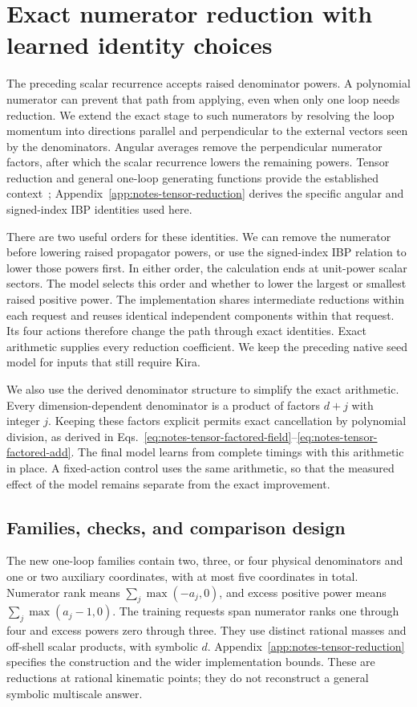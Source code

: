 \section{Exact numerator reduction with learned identity choices}
\label{sec:notes-tensor-results}
The preceding scalar recurrence accepts raised denominator powers. A polynomial numerator can prevent that path from applying, even when only one loop needs reduction. We extend the exact stage to such numerators by resolving the loop momentum into directions parallel and perpendicular to the external vectors seen by the denominators. Angular averages remove the perpendicular numerator factors, after which the scalar recurrence lowers the remaining powers. Tensor reduction and general one-loop generating functions provide the established context~\cite{DennerDittmaier2006,Hu2025}; Appendix~\ref{app:notes-tensor-reduction} derives the specific angular and signed-index IBP identities used here.

There are two useful orders for these identities. We can remove the numerator before lowering raised propagator powers, or use the signed-index IBP relation to lower those powers first. In either order, the calculation ends at unit-power scalar sectors. The model selects this order and whether to lower the largest or smallest raised positive power. The implementation shares intermediate reductions within each request and reuses identical independent components within that request. Its four actions therefore change the path through exact identities. Exact arithmetic supplies every reduction coefficient. We keep the preceding native seed model for inputs that still require Kira.

We also use the derived denominator structure to simplify the exact arithmetic. Every dimension-dependent denominator is a product of factors $d+j$ with integer $j$. Keeping these factors explicit permits exact cancellation by polynomial division, as derived in Eqs.~\eqref{eq:notes-tensor-factored-field}--\eqref{eq:notes-tensor-factored-add}. The final model learns from complete timings with this arithmetic in place. A fixed-action control uses the same arithmetic, so that the measured effect of the model remains separate from the exact improvement.

\subsection{Families, checks, and comparison design}
The new one-loop families contain two, three, or four physical denominators and one or two auxiliary coordinates, with at most five coordinates in total. Numerator rank means $\sum_j\max(-a_j,0)$, and excess positive power means $\sum_j\max(a_j-1,0)$. The training requests span numerator ranks one through four and excess powers zero through three. They use distinct rational masses and off-shell scalar products, with symbolic $d$. Appendix~\ref{app:notes-tensor-reduction} specifies the construction and the wider implementation bounds. These are reductions at rational kinematic points; they do not reconstruct a general symbolic multiscale answer.

